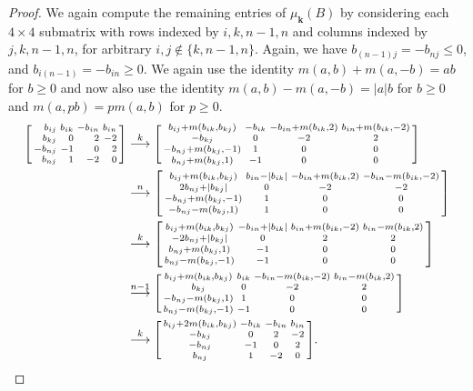 \documentclass[10pt]{article}
\theoremstyle{definition}
\theoremstyle{remark}
\numberwithin{equation}{section}
\newcommand{\set}[1]{{\lbrace #1 \rbrace}}
\newcommand{\0}{{\mathbf{0}}}
\newcommand{\kk}{{\boldsymbol{k}}}
\begin{document}
\begin{proof}
We again compute the remaining entries of $\mu_\kk(B)$ by considering each $4\times4$ submatrix with rows indexed by $i,k,n-1,n$ and columns indexed by $j,k,n-1,n$, for arbitrary $i,j\not\in\set{k,n-1,n}$.
Again, we have $b_{(n-1)j}=-b_{nj}\le0$, and $b_{i(n-1)}=-b_{in}\ge0$.
We again use the identity $m(a,b)+m(a,-b)=ab$ for $b\ge0$ and now also use the identity $m(a,b)-m(a,-b)=|a|b$ for $b\ge0$ and $m(a,pb)=pm(a,b)$ for $p\ge0$.
\begin{align*}
\begin{bsmallmatrix*}[r]
b_{ij}&b_{ik}&-b_{in}&b_{in}\\
b_{kj}&0&2&-2\\
-b_{nj}&-1&0&2\\
b_{nj}&1&-2&0
\end{bsmallmatrix*}
&\overset{k}{\longrightarrow}
\begin{bsmallmatrix*}
b_{ij}+m(b_{ik},b_{kj}) & -b_{ik} & -b_{in}+m(b_{ik},2) & b_{in}+m(b_{ik},-2)\\
-b_{kj} & 0 & -2 & 2\\
-b_{nj}+m(b_{kj},-1) & 1 & 0 & 0\\
b_{nj}+m(b_{kj},1) & -1 & 0 & 0
\end{bsmallmatrix*}\\
&\overset{n}{\longrightarrow}
\begin{bsmallmatrix*}
b_{ij}+m(b_{ik},b_{kj}) & b_{in}-|b_{ik}| & -b_{in}+m(b_{ik},2) & -b_{in}-m(b_{ik},-2)\\
2b_{nj}+|b_{kj}| & 0 & -2 & -2\\
-b_{nj}+m(b_{kj},-1) & 1 & 0 & 0\\
-b_{nj}-m(b_{kj},1) & 1 & 0 & 0
\end{bsmallmatrix*}\\
&\overset{k}{\longrightarrow}
\begin{bsmallmatrix*}
b_{ij}+m(b_{ik},b_{kj}) & -b_{in}+|b_{ik}| & b_{in}+m(b_{ik},-2) & b_{in}-m(b_{ik},2)\\
-2b_{nj}+|b_{kj}| & 0 & 2 & 2\\
b_{nj}+m(b_{kj},1)  & -1 & 0 & 0\\
b_{nj}-m(b_{kj},-1)& -1 & 0 & 0
\end{bsmallmatrix*}\\
&\overset{n-1}{\longrightarrow}
\begin{bsmallmatrix*}
b_{ij}+m(b_{ik},b_{kj}) & b_{ik} & -b_{in}-m(b_{ik},-2) & b_{in}-m(b_{ik},2)\\
b_{kj}& 0 & -2 & 2\\
-b_{nj}-m(b_{kj},1)& 1 & 0 & 0\\
b_{nj}-m(b_{kj},-1) & -1 & 0 & 0
\end{bsmallmatrix*}\\
&\overset{k}{\longrightarrow}
\begin{bsmallmatrix*}
b_{ij}+2m(b_{ik},b_{kj}) & -b_{ik} & -b_{in} & b_{in}\\
-b_{kj} & 0 & 2 & -2\\
-b_{nj} & -1 & 0 & 2\\
b_{nj} & 1 & -2 & 0
\end{bsmallmatrix*}.
\end{align*}


\end{proof}
\end{document}
